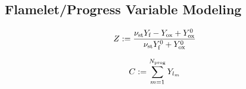 \subsection{Flamelet/Progress Variable Modeling}\label{sec:fpv}

\begin{equation}\label{eq:mixFracDef}
    Z := \frac{ \nu_{\text{st}} Y_{\text{f}} - Y_{\text{ox}} + Y^0_{\text{ox}} }{ \nu_{\text{st}} Y^0_{\text{f}} + Y^0_{\text{ox}} }
\end{equation}

\begin{equation}\label{eq:progVarDef}
	C := \sum_{m = 1}^{N_{\text{prog}}} Y_{l_{m}}
\end{equation}
